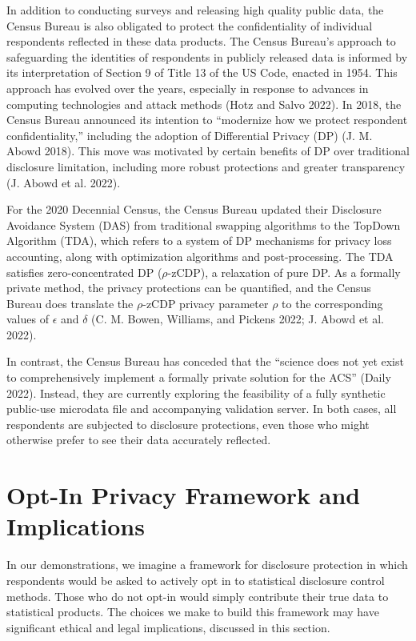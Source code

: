 \documentclass[
]{urban-formatting}
\begin{document}
In addition to conducting surveys and releasing high quality public
data, the Census Bureau is also obligated to protect the confidentiality
of individual respondents reflected in these data products. The Census
Bureau's approach to safeguarding the identities of respondents in
publicly released data is informed by its interpretation of Section 9 of
Title 13 of the US Code, enacted in 1954. This approach has evolved over
the years, especially in response to advances in computing technologies
and attack methods (Hotz and Salvo 2022). In 2018, the Census Bureau
announced its intention to ``modernize how we protect respondent
confidentiality,'' including the adoption of Differential Privacy (DP)
(J. M. Abowd 2018). This move was motivated by certain benefits of DP
over traditional disclosure limitation, including more robust
protections and greater transparency (J. Abowd et al. 2022).

For the 2020 Decennial Census, the Census Bureau updated their
Disclosure Avoidance System (DAS) from traditional swapping algorithms
to the TopDown Algorithm (TDA), which refers to a system of DP
mechanisms for privacy loss accounting, along with optimization
algorithms and post-processing. The TDA satisfies zero-concentrated DP
(\(\rho\)-zCDP), a relaxation of pure DP. As a formally private method,
the privacy protections can be quantified, and the Census Bureau does
translate the \(\rho\)-zCDP privacy parameter \(\rho\) to the
corresponding values of \(\epsilon\) and \(\delta\) (C. M. Bowen,
Williams, and Pickens 2022; J. Abowd et al. 2022).

In contrast, the Census Bureau has conceded that the ``science does not
yet exist to comprehensively implement a formally private solution for
the ACS'' (Daily 2022). Instead, they are currently exploring the
feasibility of a fully synthetic public-use microdata file and
accompanying validation server. In both cases, all respondents are
subjected to disclosure protections, even those who might otherwise
prefer to see their data accurately reflected.

\section{Opt-In Privacy Framework and Implications}

In our demonstrations, we imagine a framework for disclosure protection
in which respondents would be asked to actively opt in to statistical
disclosure control methods. Those who do not opt-in would simply
contribute their true data to statistical products. The choices we make
to build this framework may have significant ethical and legal
implications, discussed in this section.
\end{document}
